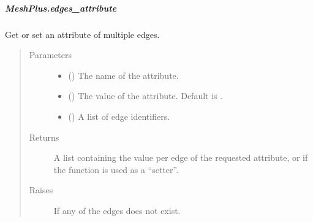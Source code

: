 \documentclass[letterpaper,10pt,english]{sphinxmanual}
\begin{document}
\begin{fulllineitems}
\subparagraph{MeshPlus.edges\_attribute}
\label{\detokenize{api/generated/directional_clustering.mesh.MeshPlus.edges_attribute:meshplus-edges-attribute}}\label{\detokenize{api/generated/directional_clustering.mesh.MeshPlus.edges_attribute::doc}}

\begin{fulllineitems}
\label{\detokenize{api/generated/directional_clustering.mesh.MeshPlus.edges_attribute:directional_clustering.mesh.MeshPlus.edges_attribute}}
Get or set an attribute of multiple edges.
\begin{quote}\begin{description}
\item[{Parameters}] \leavevmode\begin{itemize}
\item {} 
 () \textendash{} The name of the attribute.

\item {} 
 () \textendash{} The value of the attribute.
Default is .

\item {} 
 () \textendash{} A list of edge identifiers.

\end{itemize}

\item[{Returns}] \leavevmode
{} \textendash{} A list containing the value per edge of the requested attribute,
or  if the function is used as a “setter”.

\item[{Raises}] \leavevmode
{} \textendash{} If any of the edges does not exist.

\end{description}\end{quote}


\end{fulllineitems}
\end{fulllineitems}
\end{document}
